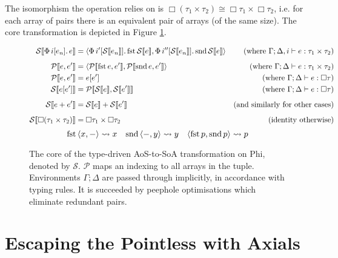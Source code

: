 The isomorphism the operation relies on is $\Box (\tau_1 \times \tau_2) \cong \Box \tau_1 \times \Box \tau_2$, i.e. for each array of pairs there is an equivalent pair of arrays (of the same size). 
The core transformation is depicted in Figure \ref{fig:aos-to-soa}.

\newcommand{\phisoa}[1]{\mathcal S \left\llbracket {#1} \right\rrbracket}
\newcommand{\phitupleindex}[2]{\mathcal P \left\llbracket {#1}, {#2} \right\rrbracket}

\begin{figure}
    \centering
    \begin{align*}
\phisoa {\phivec{i}{e_n}{e}}
&= \phipair{\phivec{i'}{\phisoa{e_n}}{\phifst{\phisoa{e}}}}{\phivec{i''}{\phisoa{e_n}}{\phisnd{\phisoa{e}}}}
&\text{(where }\Gamma; \Delta, i \vdash e : \phipairtype{\tau_1}{\tau_2} \text{)} \\[0.5em]
\phitupleindex{e}{e'}
&= \phipair{\phitupleindex{\phifst{e}}{e'}}{\phitupleindex{\phisnd{e}}{e'}}
&\text{(where }\Gamma; \Delta \vdash e : \phipairtype{\tau_1}{\tau_2} \text{)} \\
\phitupleindex{e}{e'}
&= e\left[ e' \right]
&\text{(where }\Gamma; \Delta \vdash e : \phivectype{\tau} \text{)} \\
\phisoa{e[e']}
&= \phitupleindex{\phisoa{e}}{\phisoa{e'}}
&\text{(where }\Gamma; \Delta \vdash e : \phivectype{\tau} \text{)} \\[0.5em]
\phisoa{e + e'}
&= \phisoa{e} + \phisoa{e'}
&\text{(and similarly for other cases)} \\[0.5em]
\phisoa{\phivectype{(\phipairtype{\tau_1}{\tau_2}})} &= \phipairtype{\phivectype{\tau_1}}{\phivectype{\tau_2}} &\text{(identity otherwise)}
    \end{align*}
$$ \phifst{\phipair{x}{-}} \leadsto x \quad \phisnd{\phipair{-}{y}} \leadsto y \quad \phipair{\phifst{p}}{\phisnd{p}} \leadsto p $$
    \caption{The core of the type-driven AoS-to-SoA transformation on Phi, denoted by $\mathcal S$. $\mathcal P$ maps an indexing to all arrays in the tuple. Environments $\Gamma; \Delta$ are passed through implicitly, in accordance with typing rules. It is succeeded by peephole optimisations which eliminate redundant pairs.}
    \label{fig:aos-to-soa}
\end{figure}

\needspace{5em}
\section{Escaping the Pointless with Axials}
\label{escaping-the-pointless}

